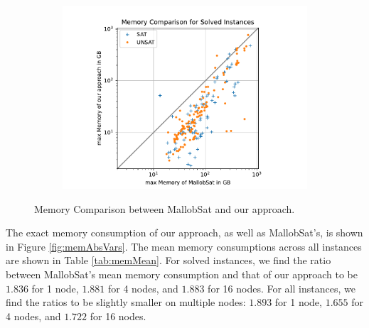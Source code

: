 \documentclass[12pt,a4paper,twoside]{scrartcl}
\numberwithin{equation}{section}
\begin{document}
\begin{figure}[!h]
\begin{subfigure}[c]{.45\textwidth}
    \includegraphics[scale=.45]{plots/square_mem_compare/square_mem_16node.pdf}
    \label{fig:memCompare16node}
  \end{subfigure}
  \caption{Memory Comparison between MallobSat and our approach.}
  \label{fig:memCompare}
\end{figure}

The exact memory consumption of our approach, as well as MallobSat's, is shown in Figure \ref{fig:memAbsVars}. The mean memory consumptions across all instances are shown in Table \ref{tab:memMean}. For solved instances, we find the ratio between MallobSat's mean memory consumption and that of our approach to be $1.836$ for 1 node, $1.881$ for 4 nodes, and $1.883$ for 16 nodes. For all instances, we find the ratios to be slightly smaller on multiple nodes: $1.893$ for 1 node, $1.655$ for 4 nodes, and $1.722$ for 16 nodes.
\end{document}
